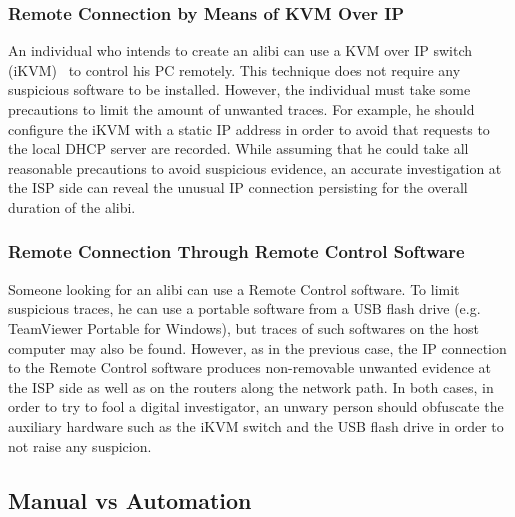 \documentclass[runningheads]{llncs}
\begin{document}
\subsubsection{Remote Connection by Means of KVM Over IP}
An individual who intends to create an alibi can use a KVM over IP switch (iKVM)~\cite{kvm}
to control his PC remotely. This technique does not require any suspicious software to be
installed. However, the individual must take some precautions to limit
the amount of unwanted traces. For example, he should configure the iKVM with a static
IP address in order to avoid that requests to the local DHCP server are recorded.
While assuming that he could take all reasonable precautions to avoid suspicious evidence, an accurate investigation at the ISP side can reveal the unusual IP connection persisting for the overall duration of the alibi.

\subsubsection{Remote Connection Through Remote Control Software}
Someone looking for an alibi can use a Remote Control software. To limit suspicious traces, he can use a portable software from
a USB flash drive (e.g. TeamViewer Portable for Windows), but traces of such softwares on the host computer may also be found.
However, as in the previous case, the IP connection to the Remote Control software produces non-removable unwanted evidence at the ISP side as well as on the routers along the network path.
In both cases, in order to try to fool a digital investigator, an unwary person should obfuscate the auxiliary hardware such as the iKVM switch and the USB flash drive in order to not raise any suspicion.

\subsection{Manual vs Automation}
\end{document}
